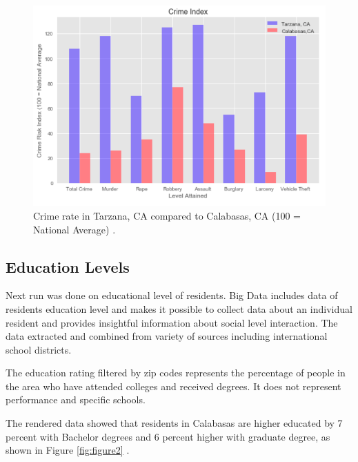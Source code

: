 \documentclass[sigconf]{acmart}
\begin{document}
\begin{figure}
  \centering
  \includegraphics[width=1.0\columnwidth]{images/figure1.png}
  \caption{Crime rate in Tarzana, CA compared to Calabasas, CA (100 = National Average) \cite{md}.} \label{fig:figure1} 
\end{figure}

\subsection{Education Levels}

Next run was done on educational level of residents.
Big Data includes data of resident\textquotesingle s education level and makes it possible to collect data about an individual resident and provides insightful information about social level interaction. The data extracted and combined from variety of sources including international school districts. 

The education rating  filtered by zip codes represents the percentage of people in the area who have attended colleges and received degrees. It does not represent performance and specific schools. 

The rendered data showed \cite{md} that residents in Calabasas are higher educated by 7 percent with Bachelor degrees and 6 percent higher with graduate degree, as shown in Figure \ref{fig:figure2} \cite{md}.
\end{document}
